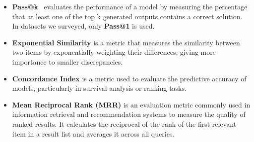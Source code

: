 \begin{itemize}[leftmargin=10pt]
    \item \textbf{Pass@k}~\cite{chen2021evaluatinglargelanguagemodels} evaluates the performance of a model by measuring the percentage that at least one of the top k generated outputs contains a correct solution. In datasets we surveyed, only \textbf{Pass@1} is used. %
    \item \textbf{Exponential Similarity} is a metric that measures the similarity between two items by exponentially weighting their differences, giving more importance to smaller discrepancies.%
    \item \textbf{Concordance Index} is a metric used to evaluate the predictive accuracy of models, particularly in survival analysis or ranking tasks. %
    \item \textbf{Mean Reciprocal Rank (MRR)} is an evaluation metric commonly used in information retrieval and recommendation systems to measure the quality of ranked results. It calculates the reciprocal of the rank of the first relevant item in a result list and averages it across all queries.%

\end{itemize}


